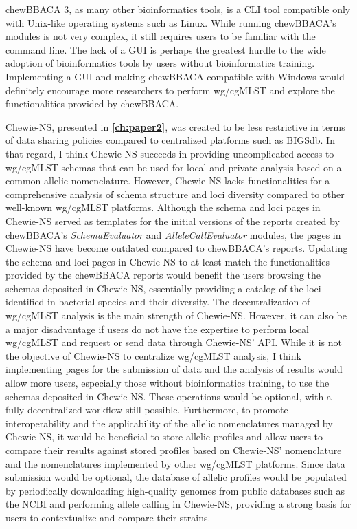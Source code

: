 chewBBACA 3, as many other bioinformatics tools, is a \ac{CLI} tool compatible only with Unix-like operating systems such as Linux. While running chewBBACA's modules is not very complex, it still requires users to be familiar with the command line. The lack of a \ac{GUI} is perhaps the greatest hurdle to the wide adoption of bioinformatics tools by users without bioinformatics training. Implementing a \ac{GUI} and making chewBBACA compatible with Windows would definitely encourage more researchers to perform \ac{wg/cgMLST} and explore the functionalities provided by chewBBACA.

\ac{Chewie-NS}, presented in \textbf{\autoref{ch:paper2}}, was created to be less restrictive in terms of data sharing policies compared to centralized platforms such as \ac{BIGSdb}. In that regard, I think \ac{Chewie-NS} succeeds in providing uncomplicated access to \ac{wg/cgMLST} schemas that can be used for local and private analysis based on a common allelic nomenclature. However, \ac{Chewie-NS} lacks functionalities for a comprehensive analysis of schema structure and loci diversity compared to other well-known \ac{wg/cgMLST} platforms. Although the schema and loci pages in \ac{Chewie-NS} served as templates for the initial versions of the reports created by chewBBACA's \textit{SchemaEvaluator} and \textit{AlleleCallEvaluator} modules, the pages in \ac{Chewie-NS} have become outdated compared to chewBBACA's reports. Updating the schema and loci pages in \ac{Chewie-NS} to at least match the functionalities provided by the chewBBACA reports would benefit the users browsing the schemas deposited in \ac{Chewie-NS}, essentially providing a catalog of the loci identified in bacterial species and their diversity. The decentralization of \ac{wg/cgMLST} analysis is the main strength of \ac{Chewie-NS}. However, it can also be a major disadvantage if users do not have the expertise to perform local \ac{wg/cgMLST} and request or send data through \ac{Chewie-NS}' \ac{API}. While it is not the objective of \ac{Chewie-NS} to centralize \ac{wg/cgMLST} analysis, I think implementing pages for the submission of data and the analysis of results would allow more users, especially those without bioinformatics training, to use the schemas deposited in \ac{Chewie-NS}. These operations would be optional, with a fully decentralized workflow still possible. Furthermore, to promote interoperability and the applicability of the allelic nomenclatures managed by \ac{Chewie-NS}, it would be beneficial to store allelic profiles and allow users to compare their results against stored profiles based on \ac{Chewie-NS}' nomenclature and the nomenclatures implemented by other \ac{wg/cgMLST} platforms. Since data submission would be optional, the database of allelic profiles would be populated by periodically downloading high-quality genomes from public databases such as the \ac{NCBI} and performing allele calling in \ac{Chewie-NS}, providing a strong basis for users to contextualize and compare their strains.

